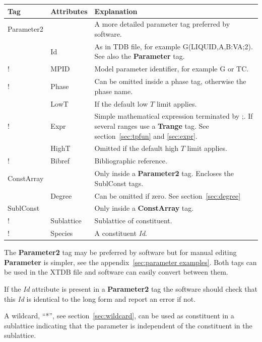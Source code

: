\documentclass{article}
\begin{document}
\bigskip
\begin{tabular}{|p{} p{} p{}|}\hline
  Tag & Attributes &  Explanation\\\hline

  Parameter2 & & A more detailed parameter tag preferred by software.\\
      & Id & As in TDB file, for example G(LIQUID,A,B:VA;2).  See also the {\bf Parameter} tag. \\
!      & MPID & Model parameter identifier, for example G or TC.\\
!      & Phase &  Can be omitted inside a phase tag, otherwise the phase name.\\
      & LowT & If the default low $T$ limit applies.\\
!      & Expr & Simple mathematical expression terminated by ;.  If several ranges use a {\bf Trange} tag.  See section~\ref{sec:tpfun} and \ref{sec:expr}.\\
      & HighT & Omitted if the default high $T$ limit applies.\\
!      & Bibref & Bibliographic reference.\\\hline

  ConstArray & & Only inside a {\bf Parameter2} tag.  Encloses the
                   SublConst tags.\\
      & Degree & Can be omitted if zero.  See section~\ref{sec:degree}\\\hline
  
  SublConst & & Only inside a {\bf ConstArray} tag. \\
!      & Sublattice &  Sublattice of constituent.\\
!      & Species & A constituent {\em Id}.\\\hline  
\end{tabular}

\bigskip
The {\bf Parameter2} tag may be preferred by software but for
manual editing {\bf Parameter} is simpler, see the
appendix~\ref{sec:parameter examples}.  Both tags can be used in
the XTDB file and software can easily convert between them.

If the {\em Id} attribute is present in a {\bf Parameter2} tag the
software should check that this {\em Id} is identical to the long form
and report an error if not.

A wildcard, ``*'', see section~\ref{sec:wildcard}, can be used as
constituent in a sublattice indicating that the parameter is
independent of the constituent in the sublattice.
\end{document}
